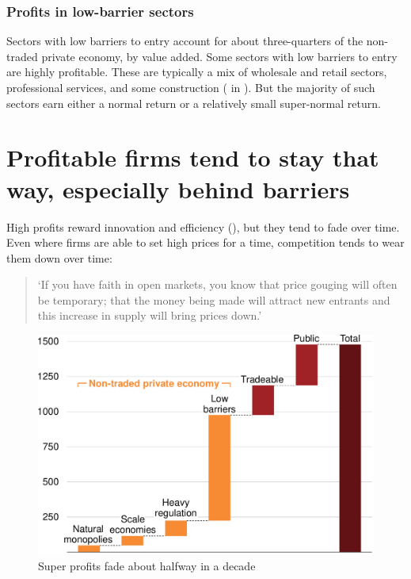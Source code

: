 \subsubsection{Profits in low-barrier sectors}

Sectors with low barriers to entry account for about three-quarters of the non-traded private economy, by value added. Some sectors with low barriers to entry are highly profitable. These are typically a mix of wholesale and retail sectors, professional services, and some construction ( in ).
But the majority of such sectors earn either a normal return or a relatively small super-normal return.

\section{Profitable firms tend to stay that way, especially behind barriers}

High profits reward innovation and efficiency (), but they tend to fade over time. 
Even where firms are able to set high prices for a time, competition tends to wear them down over time:

\begin{quote}
    `If you have faith in open markets, you know that price gouging will often be temporary; that the money being made will attract new entrants and this increase in supply will bring prices down.'
    
\end{quote}

\begin{figure}
    \caption{Super profits fade about halfway in a decade\label{fig:ROEdecay}}
  \includegraphics[page=21]{atlas/Charts} 
\end{figure}

